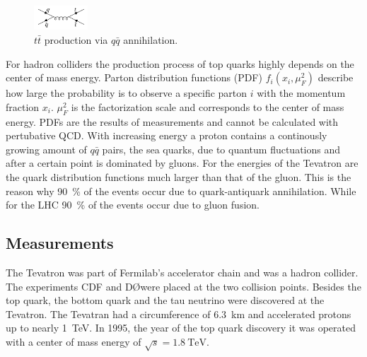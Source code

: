 \begin{figure}
    \includegraphics[width=0.18\textwidth]{graphics/tt.png}
    \caption{ $t\bar{t}$ production via $q\bar{q}$ annihilation. \cite{top-quark}}
  \end{figure}
  \FloatBarrier
For hadron colliders the production process of top quarks highly depends on the center of mass energy. Parton distribution functions (PDF) $f_i(x_i, \mu_F^2)$ describe how large the probability is to observe a specific parton $i$ with the momentum fraction $x_i$. $\mu_F^2$ is the factorization scale and corresponds to the center of mass energy. PDFs are the results of measurements and cannot be calculated with pertubative QCD. With increasing energy a proton contains a continously growing amount of $q\bar{q}$ pairs, the sea quarks, due to quantum fluctuations and after a certain point is dominated by gluons. For the energies of the Tevatron are the quark distribution functions much larger than that of the gluon. This is the reason why \SI{90}{\percent} of the events occur due to quark-antiquark annihilation. While for the LHC \SI{90}{\percent} of the events occur due to gluon fusion.
\subsection*{Measurements}
The Tevatron was part of Fermilab's accelerator chain and was a hadron collider. The experiments CDF and D\O were placed at the two collision points. Besides the top quark, the bottom quark and the tau neutrino were discovered at the Tevatron. The Tevatran had a circumference of \SI{6.3}{\kilo\meter} and accelerated protons up to nearly \SI{1}{\TeV}. In 1995, the year of the top quark discovery it was operated with a center of mass energy of $\sqrt{s}=\SI{1.8}{\TeV}$.
